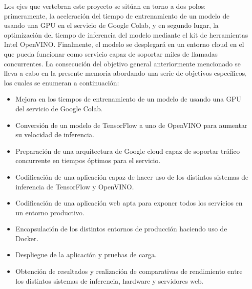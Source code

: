 Los ejes que vertebran este proyecto se sitúan en torno a dos polos: primeramente, la aceleración del tiempo de entrenamiento de un modelo de  usando una GPU\cite{gpu_solution}
en el servicio de Google Colab, y en segundo lugar, la optimización del tiempo de inferencia del modelo mediante el kit de herramientas Intel OpenVINO. Finalmente, el modelo se desplegará en un entorno cloud en el que pueda funcionar como servicio capaz de soportar miles de llamadas concurrentes.
La consecución del objetivo general anteriormente mencionado se lleva a cabo en la presente memoria abordando una serie de objetivos específicos, los cuales se enumeran a
continuación:
\begin{itemize}
    \item Mejora en los tiempos de entrenamiento de un modelo de  usando una GPU del servicio de Google Colab.
    \item Conversión de un modelo de TensorFlow a uno de OpenVINO para aumentar su velocidad de inferencia.
    \item Preparación de una arquitectura de Google cloud capaz de soportar tráfico concurrente en tiempos óptimos para el servicio.
    \item Codificación de una aplicación capaz de hacer uso de los distintos sistemas de inferencia de TensorFlow y OpenVINO\@.
    \item Codificación de una aplicación web apta para exponer todos los servicios en un entorno productivo.
    \item Encapsulación de los distintos entornos de producción haciendo uso de Docker.
    \item Despliegue de la aplicación y pruebas de carga.
    \item Obtención de resultados y realización de comparativas de rendimiento entre los distintos sistemas de inferencia, hardware y servidores web.
\end{itemize}


